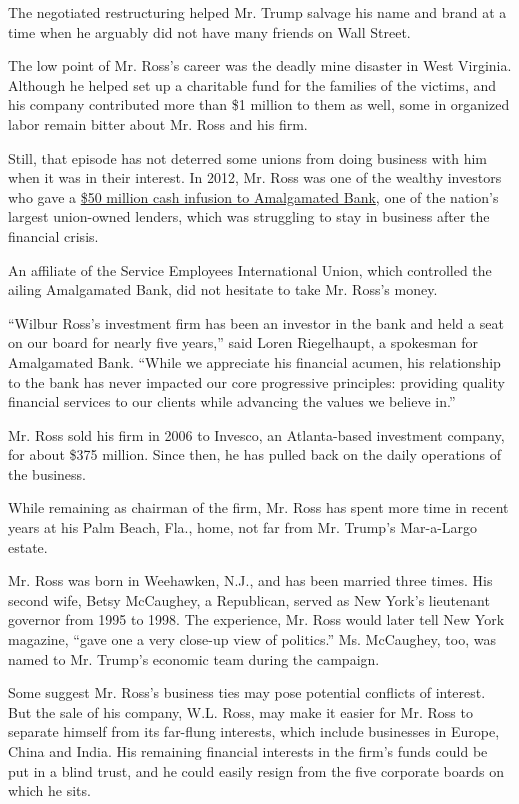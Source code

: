 The negotiated restructuring helped Mr. Trump salvage his name and brand
at a time when he arguably did not have many friends on Wall Street.

The low point of Mr. Ross's career was the deadly mine disaster in West
Virginia. Although he helped set up a charitable fund for the families
of the victims, and his company contributed more than \$1 million to
them as well, some in organized labor remain bitter about Mr. Ross and
his firm.

Still, that episode has not deterred some unions from doing business
with him when it was in their interest. In 2012, Mr. Ross was one of the
wealthy investors who gave a
\href{http://dealbook.nytimes.com/2014/08/01/at-union-owned-amalgamated-bank-new-chief-charts-a-progressive-course/}{\$50
million cash infusion to Amalgamated Bank}, one of the nation's largest
union-owned lenders, which was struggling to stay in business after the
financial crisis.

An affiliate of the Service Employees International Union, which
controlled the ailing Amalgamated Bank, did not hesitate to take Mr.
Ross's money.

``Wilbur Ross's investment firm has been an investor in the bank and
held a seat on our board for nearly five years,'' said Loren
Riegelhaupt, a spokesman for Amalgamated Bank. ``While we appreciate his
financial acumen, his relationship to the bank has never impacted our
core progressive principles: providing quality financial services to our
clients while advancing the values we believe in.''

Mr. Ross sold his firm in 2006 to Invesco, an Atlanta-based investment
company, for about \$375 million. Since then, he has pulled back on the
daily operations of the business.

While remaining as chairman of the firm, Mr. Ross has spent more time in
recent years at his Palm Beach, Fla., home, not far from Mr. Trump's
Mar-a-Largo estate.

Mr. Ross was born in Weehawken, N.J., and has been married three times.
His second wife, Betsy McCaughey, a Republican, served as New York's
lieutenant governor from 1995 to 1998. The experience, Mr. Ross would
later tell New York magazine, ``gave one a very close-up view of
politics.'' Ms. McCaughey, too, was named to Mr. Trump's economic team
during the campaign.

Some suggest Mr. Ross's business ties may pose potential conflicts of
interest. But the sale of his company, W.L. Ross, may make it easier for
Mr. Ross to separate himself from its far-flung interests, which include
businesses in Europe, China and India. His remaining financial interests
in the firm's funds could be put in a blind trust, and he could easily
resign from the five corporate boards on which he sits.

